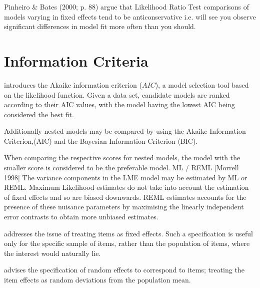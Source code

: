 \documentclass[12pt, a4paper]{report}
\theoremstyle{plain}
\theoremstyle{definition}
\theoremstyle{remark}
\begin{document}
Pinheiro \& Bates (2000; p. 88) argue that Likelihood Ratio Test comparisons of models varying in fixed effects tend to be anticonservative i.e. 
will see you observe significant differences in model fit more often than you should. 




\section{Information Criteria}

\citet{akaike} introduces the Akaike information criterion ($AIC$), a model selection tool based on the likelihood function. Given a data set, candidate models are ranked according to their AIC values, with the model having the lowest AIC being considered the best fit.


Additionally nested models may be compared by using the Akaike Information Criterion,(AIC) and the Bayesian Information Criterion (BIC).

When comparing the respective scores for nested models, the model with the smaller score is considered to be the preferable model.
ML / REML
[Morrell 1998]
The variance components in the LME model may be estimated by ML or REML.
Maximum Likelihood estimates do not take into account the estimation of fixed effects and so
are biased downwards.
REML estimates accounts for the presence of these nuisance parameters by maximising the linearly independent error contrasts to obtain more unbiased estimates.

\citet{PB} addresses the issue of treating items as fixed effects. Such a specification is useful only for the specific sample of items, rather than the population of items, where the interest would naturally lie.

\citet{PB} advises the specification of random effects to correspond to items; treating the item effects as random deviations from the population mean.
\end{document}
